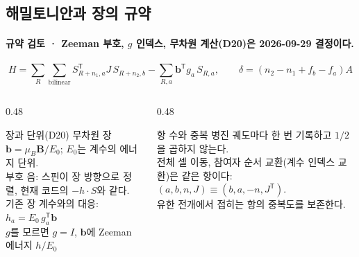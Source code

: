 \subsection{해밀토니안과 장의 규약}\label{hamiltonian-convention}
\begingroup%
  \framesubtitle{규약 검토 · Zeeman 부호, $g$ 인덱스, 무차원 계산(D20)은 2026-09-29 결정이다.}
  \[
    H=\sum_{R}\sum_{\mathrm{bilinear}} S_{R+n_1,a}^{\mathsf T}J\,S_{R+n_2,b}
      -\sum_{R,a}\mathbf b^{\mathsf T}g_a\,S_{R,a},
    \qquad \delta=(n_2-n_1+f_b-f_a)A
  \]
  \begin{columns}[T,onlytextwidth]
    \begin{column}{0.48\textwidth}
      \begin{block}{장과 단위(D20)}
        무차원 장 $\mathbf b=\mu_B\mathbf B/E_0$; $E_0$는 계수의 에너지 단위.\\[0.4em]
        부호 음: 스핀이 장 방향으로 정렬, 현재 코드의 $-h\cdot S$와 같다.\\[0.4em]
        기존 장 계수와의 대응: $h_a=E_0\,g_a^{\mathsf T}\mathbf b$\\[0.4em]
        $g$를 모르면 $g=I$, $\mathbf b$에 Zeeman 에너지 $h/E_0$
      \end{block}
    \end{column}
    \begin{column}{0.48\textwidth}
      \begin{block}{항 수와 중복}
        병진 궤도마다 한 번 기록하고 $1/2$을 곱하지 않는다.\\[0.4em]
        전체 셀 이동, 참여자 순서 교환(계수 인덱스 교환)은 같은 항이다:
        $(a,b,n,J)\equiv(b,a,-n,J^{\mathsf T})$.\\[0.4em]
        유한 전개에서 접히는 항의 중복도를 보존한다.
      \end{block}
    \end{column}
  \end{columns}
\endgroup


